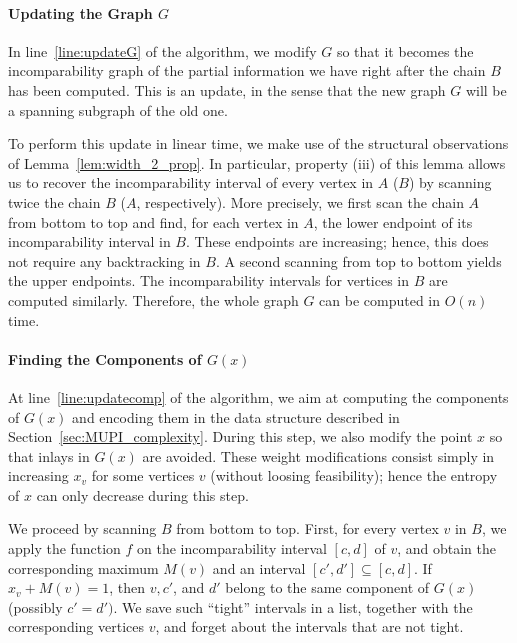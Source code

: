 \documentclass{article} \usepackage{fullpage}
\begin{document}
\paragraph*{Updating the Graph $G$}
In line~\ref{line:updateG} of the algorithm, we modify $G$ so that it becomes the incomparability graph of the partial information we have right after the chain $B$ has been computed. This is an update, in the sense that the new graph $G$ will be a spanning subgraph of the old one.

To perform this update in linear time, we make use of the structural observations of Lemma~\ref{lem:width_2_prop}. In particular, property (iii) of this lemma allows us to recover the incomparability interval of every vertex in $A$ ($B$) by scanning twice the chain $B$ ($A$, respectively). More precisely, we first scan the chain $A$ from bottom to top and find, for each vertex in $A$, the lower endpoint of its incomparability interval in $B$. These endpoints are increasing; hence, this does not require any backtracking in $B$. A second scanning from top to bottom yields the upper endpoints. The incomparability intervals for vertices in $B$ are computed similarly. Therefore, the whole graph $G$ can be computed in $O(n)$ time.

\paragraph*{Finding the Components of $G(x)$}
At line~\ref{line:updatecomp} of the algorithm, we aim at computing the components of $G(x)$ and encoding them in the data structure described in Section~\ref{sec:MUPI_complexity}. During this step, we also modify the point $x$ so that inlays in $G(x)$ are avoided. These weight modifications consist simply in increasing $x_{v}$ for some vertices $v$ (without loosing feasibility); hence the entropy of $x$ can only decrease during this step.

We proceed by scanning $B$ from bottom to top. First, for every vertex $v$ in $B$, we apply the function $f$ on the incomparability interval $[c,d]$ of $v$, and obtain the corresponding maximum $M(v)$ and an interval $[c', d'] \subseteq [c,d]$. If $x_{v} + M(v) = 1$, then $v, c'$, and $d'$ belong to the same component of $G(x)$ (possibly $c' = d')$. We save such ``tight'' intervals in a list, together with the corresponding vertices $v$, and forget about the intervals that are not tight.
\end{document}
